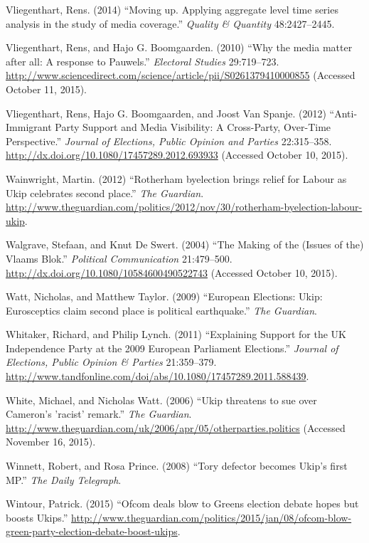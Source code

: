 \documentclass[12pt,article]{article}
\begin{document}
Vliegenthart, Rens. (2014) ``Moving up. Applying aggregate level time
series analysis in the study of media coverage.'' \emph{Quality \&
Quantity} 48:2427--2445.

Vliegenthart, Rens, and Hajo G. Boomgaarden. (2010) ``Why the media
matter after all: A response to Pauwels.'' \emph{Electoral Studies}
29:719--723.
\url{http://www.sciencedirect.com/science/article/pii/S0261379410000855}
(Accessed October 11, 2015).

Vliegenthart, Rens, Hajo G. Boomgaarden, and Joost Van Spanje. (2012)
``Anti-Immigrant Party Support and Media Visibility: A Cross-Party,
Over-Time Perspective.'' \emph{Journal of Elections, Public Opinion and
Parties} 22:315--358.
\url{http://dx.doi.org/10.1080/17457289.2012.693933} (Accessed October
10, 2015).

Wainwright, Martin. (2012) ``Rotherham byelection brings relief for
Labour as Ukip celebrates second place.'' \emph{The Guardian}.
\url{http://www.theguardian.com/politics/2012/nov/30/rotherham-byelection-labour-ukip}.

Walgrave, Stefaan, and Knut De Swert. (2004) ``The Making of the (Issues
of the) Vlaams Blok.'' \emph{Political Communication} 21:479--500.
\url{http://dx.doi.org/10.1080/10584600490522743} (Accessed October 10,
2015).

Watt, Nicholas, and Matthew Taylor. (2009) ``European Elections: Ukip:
Eurosceptics claim second place is political earthquake.'' \emph{The
Guardian}.

Whitaker, Richard, and Philip Lynch. (2011) ``Explaining Support for the
UK Independence Party at the 2009 European Parliament Elections.''
\emph{Journal of Elections, Public Opinion \& Parties} 21:359--379.
\url{http://www.tandfonline.com/doi/abs/10.1080/17457289.2011.588439}.

White, Michael, and Nicholas Watt. (2006) ``Ukip threatens to sue over
Cameron's 'racist' remark.'' \emph{The Guardian}.
\url{http://www.theguardian.com/uk/2006/apr/05/otherparties.politics}
(Accessed November 16, 2015).

Winnett, Robert, and Rosa Prince. (2008) ``Tory defector becomes Ukip's
first MP.'' \emph{The Daily Telegraph}.

Wintour, Patrick. (2015) ``Ofcom deals blow to Greens election debate
hopes but boosts Ukips.''
\url{http://www.theguardian.com/politics/2015/jan/08/ofcom-blow-green-party-election-debate-boost-ukips}.
\end{document}
